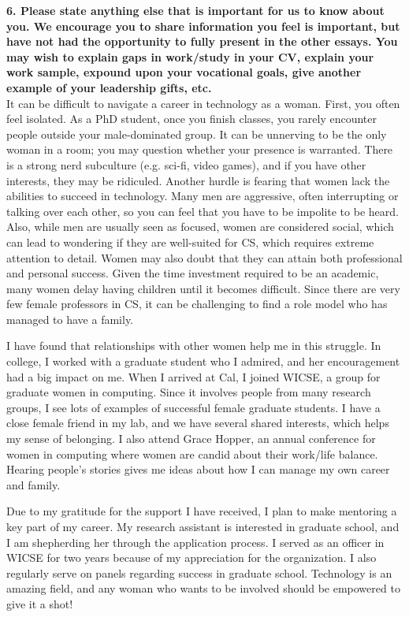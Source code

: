 \documentclass{article}
\begin{document}
\pagestyle{plain}

\noindent\textbf{6.  Please state anything else that is important for us to know about you. We encourage you to share information you feel is important, but have not had the opportunity to fully present in the other essays. You may wish to explain gaps in work/study in your CV, explain your work sample, expound upon your vocational goals, give another example of your leadership gifts, etc.}\\

It can be difficult to navigate a career in technology as a woman.
First, you often feel isolated.
As a PhD student, once you finish classes, you rarely encounter people outside your male-dominated group.
It can be unnerving to be the only woman in a room; you may question whether your presence is warranted.
There is a strong nerd subculture (e.g. sci-fi, video games), and if you have other interests, they may be ridiculed.
Another hurdle is fearing that women lack the abilities to succeed in technology.
Many men are aggressive, often interrupting or talking over each other, so you can feel that you have to be impolite to be heard.
Also, while men are usually seen as focused, women are considered social, which can lead to wondering if they are well-suited for CS, which requires extreme attention to detail.
Women may also doubt that they can attain both professional and personal success.
Given the time investment required to be an academic, many women delay having children until it becomes difficult.
Since there are very few female professors in CS, it can be challenging to find a role model who has managed to have a family.

I have found that relationships with other women help me in this struggle.
In college, I worked with a graduate student who I admired, and her encouragement had a big impact on me.
When I arrived at Cal, I joined WICSE, a group for graduate women in computing.
Since it involves people from many research groups, I see lots of examples of successful female graduate students.
I have a close female friend in my lab, and we have several shared interests, which helps my sense of belonging.
I also attend Grace Hopper, an annual conference for women in computing where women are candid about their work/life balance.
Hearing people's stories gives me ideas about how I can manage my own career and family.

Due to my gratitude for the support I have received, I plan to make mentoring a key part of my career.
My research assistant is interested in graduate school, and I am shepherding her through the application process.
I served as an officer in WICSE for two years because of my appreciation for the organization.
I also regularly serve on panels regarding success in graduate school.
Technology is an amazing field, and any woman who wants to be involved should be empowered to give it a shot!
\end{document}
